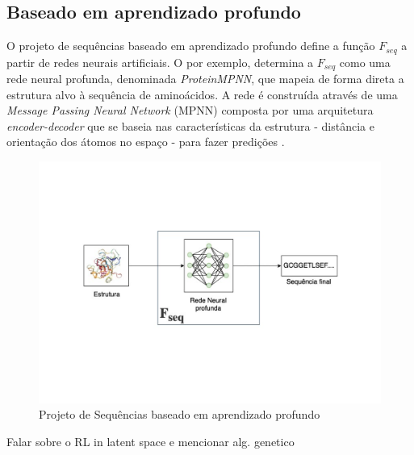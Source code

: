 \subsection{Baseado em aprendizado profundo}

O projeto de sequências baseado em aprendizado profundo define a função $F_{seq}$ a partir de redes neurais artificiais. 
O \cite{ProteinMPNN} por exemplo, determina a $F_{seq}$ como uma rede neural profunda, denominada \textit{ProteinMPNN}, 
que mapeia de forma direta a estrutura alvo à sequência de aminoácidos. 
A rede é construída através de uma \textit{Message Passing Neural Network} (MPNN) composta por uma arquitetura \textit{encoder-decoder} 
que se baseia nas características da estrutura - distância e orientação dos átomos no espaço - para fazer predições \cite{ProteinMPNN}. 

\begin{figure}[H]
  \centering
  \includegraphics[width=.8\textwidth]{figuras/metodologia-DeepLearningBased.pdf}
  \caption{Projeto de Sequências baseado em aprendizado profundo} 
\end{figure}

{\color{red} Falar sobre o RL in latent space e mencionar alg. genetico}

